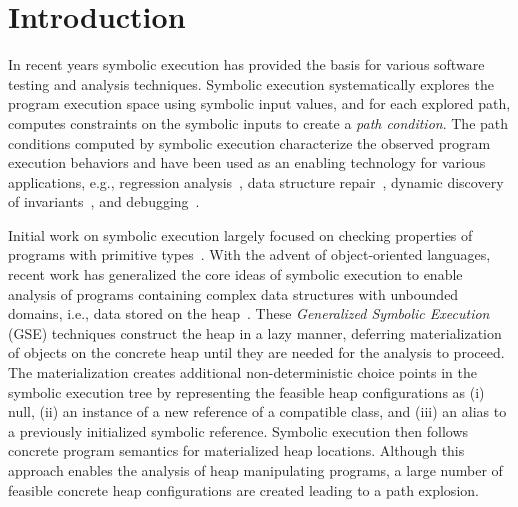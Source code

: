 \section{Introduction}

In recent years symbolic execution has provided the basis for various
software testing and analysis techniques. Symbolic execution
systematically explores the program execution space using symbolic
input values, and for each explored path, computes constraints on the
symbolic inputs to create a \emph{ path condition}.  The path
conditions computed by symbolic execution characterize the observed
program execution behaviors and have been used as an enabling
technology for various applications, e.g., regression
analysis~\cite{backes:2012,Godefroid:SAS11,Person:FSE08,person:pldi2011,Ramos:2011,Yang:ISSTA12},
data structure repair~\cite{KhurshidETAL05RepairingStructurally},
dynamic discovery of
invariants~\cite{CsallnerETAL08DySy,Zhang:ISSTA14}, and
debugging~\cite{Ma:2011}.

Initial work on symbolic execution largely focused on checking
properties of programs with primitive
types~\cite{clarke76TSE,King:76}.  With the advent of object-oriented
languages, recent work has generalized the core ideas of symbolic
execution to enable analysis of programs containing complex data
structures with unbounded domains, i.e., data stored on the
heap~\cite{Kiasan06,Kiasan07,GSE03}.  These \emph{Generalized Symbolic
  Execution} (GSE) techniques construct the heap in a lazy manner,
deferring materialization of objects on the concrete heap until they
are needed for the analysis to proceed. The materialization creates
additional non-deterministic choice points in the symbolic execution
tree by representing the feasible heap configurations as (i) null,
(ii) an instance of a new reference of a compatible class, and (iii)
an alias to a previously initialized symbolic reference.  Symbolic
execution then follows concrete program semantics for materialized
heap locations. Although this approach enables the analysis of heap
manipulating programs, a large number of feasible concrete heap
configurations are created leading to a path explosion.


